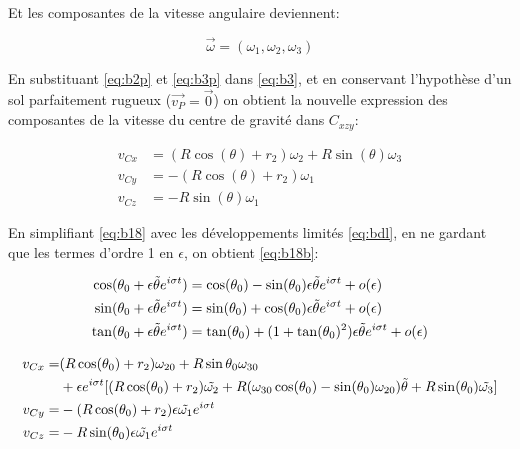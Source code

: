 Et les composantes de la vitesse angulaire deviennent:

\begin{equation}
    \vec{\omega}=(\omega_1,\omega_2,\omega_3)
    \label{eq:b3p}
\end{equation}

En substituant \ref{eq:b2p} et \ref{eq:b3p} dans \ref{eq:b3}, et en conservant l'hypothèse d'un sol parfaitement rugueux ($\vec{v_P}=\vec{0}$) on obtient la nouvelle expression des composantes de la vitesse du centre de gravité dans $C_{xzy}$:

\begin{align}
    v_{Cx}&=(R\cos(\theta)+r_2)\omega_2+R \sin(\theta)\omega_3 \nonumber\\
    v_{Cy} &= -(R\cos(\theta)+r_2)\omega_1 \nonumber\\
    v_{Cz} &= -R \sin(\theta)\omega_1
  \label{eq:b18}
\end{align}

En simplifiant \ref{eq:b18} avec les développements limités \ref{eq:bdl}, en ne gardant que les termes d'ordre 1 en $\epsilon$, on obtient \ref{eq:b18b}:

\begin{align}
    \cos(\theta_0 + \epsilon \Tilde{\theta} e^{i \sigma t})&=\cos(\theta_0)- \sin(\theta_0)\epsilon \Tilde{\theta} e^{i \sigma t} + o(\epsilon) \nonumber\\
    \sin(\theta_0 + \epsilon \Tilde{\theta} e^{i \sigma t})&=\sin(\theta_0)+ \cos(\theta_0)\epsilon \Tilde{\theta} e^{i \sigma t} + o(\epsilon)\nonumber\\
    \tan(\theta_0 + \epsilon \Tilde{\theta} e^{i \sigma t})&=\tan(\theta_0)+ (1+\tan(\theta_0)^2)\epsilon \Tilde{\theta} e^{i \sigma t} + o(\epsilon)
\label{eq:bdl}
\end{align}

\begin{align}
    v_{Cx}=&(R\cos(\theta_0)+r_2)\omega_{20}+R \sin{\theta_0}\omega_{30} \nonumber\\ 
    &+ \epsilon e^{i \sigma t}[(R\cos(\theta_0)+r_2) \Tilde{\omega_2} +R(\omega_{30}\cos(\theta_0)-\sin(\theta_0)\omega_{20}) \Tilde{\theta}+R\sin(\theta_0) \Tilde{\omega_3} ] \nonumber\\ 
    v_{Cy} =& -(R\cos(\theta_0)+r_2)\epsilon \Tilde{\omega_1} e^{i \sigma t} \nonumber\\ 
    v_{Cz} =& -R \sin(\theta_0)\epsilon \Tilde{\omega_1} e^{i \sigma t}
  \label{eq:b18b}
\end{align}

